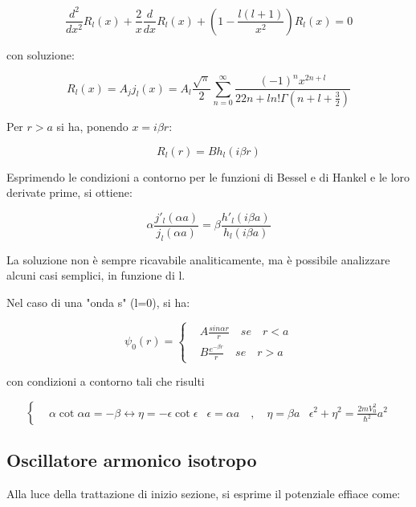 \documentclass{article}
\begin{document}
\begin{equation}
    \frac{d^2}{dx^2}R_l(x)+\frac{2}{x}\frac{d}{dx}R_l(x)+\left(1-\frac{l(l+1)}{x^2}\right)R_l(x)=0
\end{equation}

con soluzione:

\begin{equation}
    R_l(x)=A_j j_l(x)=A_l \frac{\sqrt{\pi}}{2}\sum_{n=0}^{\infty}\frac{(-1)^nx^{2n+l}}{2{2n+l}n!\Gamma(n+l+\frac{3}{2})}
\end{equation}

Per $r>a$ si ha, ponendo $x=i\beta r$:

\begin{equation}
    R_l(r)=Bh_l(i\beta r)
\end{equation}

Esprimendo le condizioni a contorno per le funzioni di Bessel e di Hankel e le loro derivate prime, si ottiene:

\begin{equation}
    \alpha \frac{j'_l(\alpha a)}{j_l(\alpha a)}=\beta \frac{h'_l(i\beta a)}{h_l(i\beta a)}
\end{equation}

La soluzione non è sempre ricavabile analiticamente, ma è possibile analizzare alcuni casi semplici, in funzione di l.

Nel caso di una "onda s" (l=0), si ha:

\begin{equation}
    \psi_0(r)=
    \left\{
    \begin{aligned}
         & A\frac{sin{\alpha r}}{r} \quad se \quad r<a \\
         & B\frac{e^{-\beta r}}{r} \quad se \quad r>a
    \end{aligned}
    \right.
\end{equation}

con condizioni a contorno tali che risulti

\begin{equation}
    \left\{
    \begin{aligned}
         & \alpha \cot{\alpha a}=-\beta \leftrightarrow \eta=-\epsilon \cot{\epsilon}
         & \epsilon=\alpha a \quad , \quad \eta=\beta a
         & \epsilon^2+\eta^2=\frac{2mV_0^2}{\hbar^2}a^2
    \end{aligned}
    \right.
\end{equation}

\subsection{Oscillatore armonico isotropo}
Alla luce della trattazione di inizio sezione, si esprime il potenziale effiace come:
\end{document}
